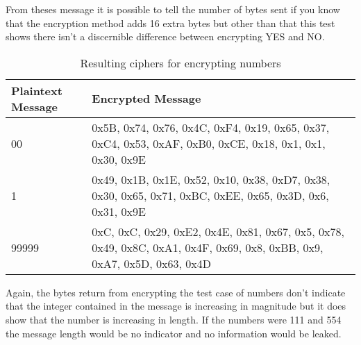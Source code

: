 From theses message it is possible to tell the number of bytes sent if you know that the encryption method adds 16 extra bytes but other than that this test shows there isn't a discernible difference between encrypting YES and NO.

\begin{table}[H]
	\centering
	\begin{tabular}{ | l | p{7cm} | }
	\hline
	Plaintext Message & Encrypted Message \\ \hline
	00 & 0x5B, 0x74, 0x76, 0x4C, 0xF4, 0x19, 0x65, 0x37, 0xC4, 0x53, 0xAF, 0xB0, 0xCE, 0x18, 0x1, 0x1, 0x30, 0x9E \\ \hline
	1 & 0x49, 0x1B, 0x1E, 0x52, 0x10, 0x38, 0xD7, 0x38, 0x30, 0x65, 0x71, 0xBC, 0xEE, 0x65, 0x3D, 0x6, 0x31, 0x9E\\ \hline
	99999 & 0xC, 0xC, 0x29, 0xE2, 0x4E, 0x81, 0x67, 0x5, 0x78, 0x49, 0x8C, 0xA1, 0x4F, 0x69, 0x8, 0xBB, 0x9, 0xA7, 0x5D, 0x63, 0x4D \\ \hline
	\end{tabular}
	\caption{Resulting ciphers for encrypting numbers}
	\label{tab:9999}
\end{table}

Again, the bytes return from encrypting the test case of numbers don't indicate that the integer contained in the message is increasing in magnitude but it does show that the number is increasing in length. If the numbers were 111 and 554 the message length would be no indicator and no information would be leaked.



